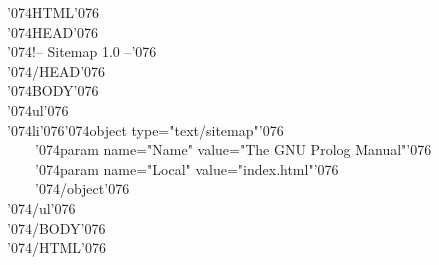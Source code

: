 \documentclass{article}
\def\lt{\char'074}
\def\gt{\char'076}
\newcommand{\Tag}[1]{{\lt}#1{\gt}}
\renewenvironment{tocenv}{\Tag{ul}\\}{\Tag{/ul}\\}
\newcommand{\OneEntry}[2]{%
\Tag{li}\Tag{object type="text/sitemap"}\\%
~~~~\Tag{param name="Name" value="{\def\\{}#2}"}\\%
~~~~\Tag{param name="Local" value="#1"}\\%
~~~~\Tag{/object}\\}
\begin{document}
\Tag{HTML}\\
\Tag{HEAD}\\
\Tag{!-- Sitemap 1.0 --}\\
\Tag{/HEAD}\\
\Tag{BODY}\\
\begin{tocenv}
\OneEntry{index.html}{The GNU Prolog Manual}

%
\end{tocenv}
\Tag{/BODY}\\
\Tag{/HTML}\\
\end{document}
